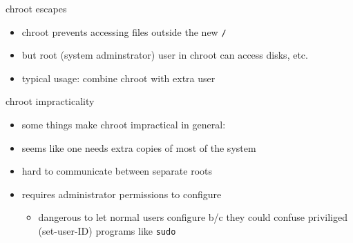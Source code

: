 \begin{frame}{chroot escapes}
    \begin{itemize}
    \item chroot prevents accessing files outside the new \texttt{/}
    \item but root (system adminstrator) user in chroot can access disks, etc.
    \vspace{.5cm}
    \item typical usage: combine chroot with extra user
    \end{itemize}
\end{frame}

\begin{frame}{chroot impracticality}
    \begin{itemize}
    \item some things make chroot impractical in general:
    \vspace{.5cm}
    \item seems like one needs extra copies of most of the system
    \item hard to communicate between separate roots
    \item requires administrator permissions to configure
        \begin{itemize}
        \item dangerous to let normal users configure b/c they could confuse priviliged (set-user-ID) programs like \texttt{sudo}
        \end{itemize}
    \end{itemize}
\end{frame}
